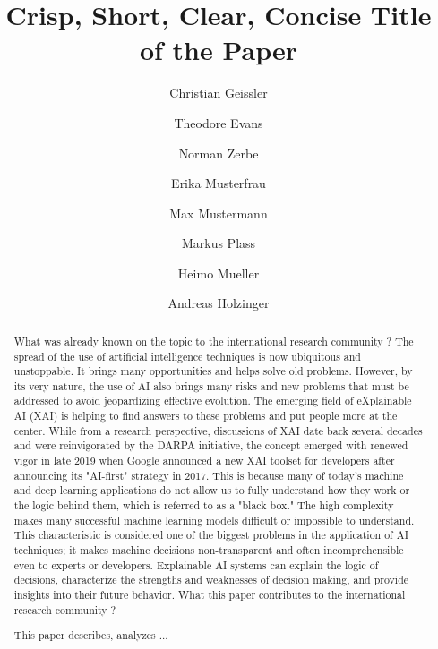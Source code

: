 \documentclass[a4paper,5p,review]{elsarticle}
\def\corref#1{}%
\begin{document}
\begin{frontmatter}

\title{Crisp, Short, Clear, Concise Title of the Paper}

\author[TUB]{Christian Geissler}
\author[TUB]{Theodore Evans}
\author[CAR]{Norman Zerbe}
\author[xxx]{Erika Musterfrau}
\author[xxx]{Max Mustermann}
\author[MUG]{Markus Plass}
\author[MUG]{Heimo Mueller}
\author[MUG,amii]{Andreas Holzinger \corref{mycorrespondingauthor}}

\address[TUB]{Technical University Berlin}
\address[MUG]{Medical University Graz, Austria}
\address[amii]{Alberta Machine Intelligence Institute, Canada}
\address[xxx]{Lab Name, University Name, Address}

\begin{abstract} 
What was already known on the topic to the international research community ?
The spread of the use of artificial intelligence techniques is now ubiquitous and unstoppable. It brings many opportunities and helps solve old problems. However, by its very nature, the use of AI also brings many risks and new problems that must be addressed to avoid jeopardizing effective evolution. The emerging field of eXplainable AI (XAI) is helping to find answers to these problems and put people more at the center.
While from a research perspective, discussions of XAI date back several decades and were reinvigorated by the DARPA initiative, the concept emerged with renewed vigor in late 2019 when Google announced a new XAI toolset for developers after announcing its "AI-first" strategy in 2017. This is because many of today's machine and deep learning applications do not allow us to fully understand how they work or the logic behind them, which is referred to as a "black box." The high complexity makes many successful machine learning models difficult or impossible to understand. This characteristic is considered one of the biggest problems in the application of AI techniques; it makes machine decisions non-transparent and often incomprehensible even to experts or developers. Explainable AI systems can explain the logic of decisions, characterize the strengths and weaknesses of decision making, and provide insights into their future behavior.
What this paper contributes to the international research community ?

This paper describes, analyzes  ...


\end{abstract}
\end{frontmatter}
\end{document}
